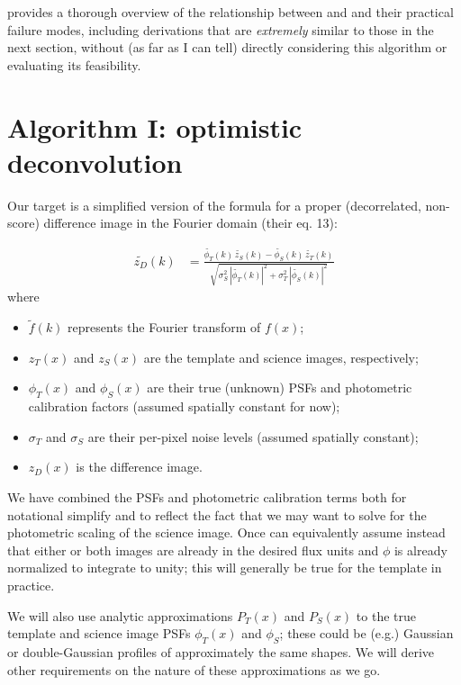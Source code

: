 \documentclass[DM,authoryear,toc]{lsstdoc}
\newcommand{\ZOGY}{\citetalias{2016ApJ...830...27Z}}
\newcommand{\AL}{\citetalias{1998ApJ...503..325A}}
\begin{document}
 provides a thorough overview of the relationship between \ZOGY{} and \AL{} and their practical failure modes, including derivations that are \emph{extremely} similar to those in the next section, without (as far as I can tell) directly considering this algorithm or evaluating its feasibility.

\section{Algorithm I: optimistic deconvolution}

Our target is a simplified version of the \ZOGY{} formula for a proper (decorrelated, non-score) difference image in the Fourier domain (their eq. 13):

\begin{align}
  \widetilde{z_D}(k) & = \frac{
    \widetilde{\phi_T}(k) \, \widetilde{z_S}(k)
    - \widetilde{\phi_S}(k) \, \widetilde{z_T}(k)
  }{
    \sqrt{
      \sigma_S^2 \, \left|\widetilde{\phi_T}(k)\right|^2
      + \sigma_T^2 \, \left|\widetilde{\phi_S}(k)\right|^2
    }
  }
\end{align}
where
\begin{itemize}
  \item $\widetilde{f}(k)$ represents the Fourier transform of $f(x)$;
  \item $z_T(x)$ and $z_S(x)$ are the template and science images, respectively;
  \item $\phi_T(x)$ and $\phi_S(x)$ are their true (unknown) PSFs and photometric calibration factors (assumed spatially constant for now);
  \item $\sigma_T$ and $\sigma_S$ are their per-pixel noise levels (assumed spatially constant);
  \item $z_D(x)$ is the difference image.
\end{itemize}
We have combined the PSFs and photometric calibration terms both for notational simplify and to reflect the fact that we may want to solve for the photometric scaling of the science image.
Once can equivalently assume instead that either or both images are already in the desired flux units and $\phi$ is already normalized to integrate to unity; this will generally be true for the template in practice.

We will also use analytic approximations $P_T(x)$ and $P_S(x)$ to the true template and science image PSFs $\phi_T(x)$ and $\phi_S$; these could be (e.g.) Gaussian or double-Gaussian profiles of approximately the same shapes.
We will derive other requirements on the nature of these approximations as we go.
\end{document}
